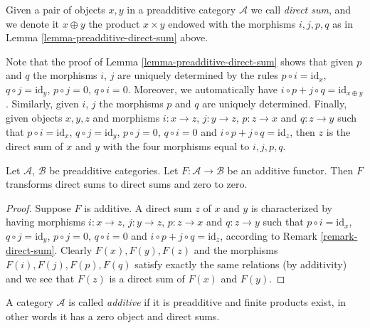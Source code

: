 \begin{definition}
\label{definition-direct-sum}
Given a pair of objects $x, y$
in a preadditive category $\mathcal{A}$ we call
{\it direct sum}, and we denote it $x \oplus y$ the
product $x \times y$ endowed with the morphisms
$i, j, p, q$ as in Lemma \ref{lemma-preadditive-direct-sum} above.
\end{definition}

\begin{remark}
\label{remark-direct-sum}
Note that the proof of Lemma \ref{lemma-preadditive-direct-sum}
shows that given $p$ and $q$ the morphisms $i$, $j$ are uniquely
determined by the rules $p \circ i = \text{id}_x$,
$q \circ j = \text{id}_y$, $p \circ j = 0$, $q \circ i = 0$.
Moreover, we automatically have
$i \circ p + j \circ q = \text{id}_{x \oplus y}$.
Similarly, given $i$, $j$ the morphisms $p$ and $q$ are uniquely determined.
Finally, given objects $x, y, z$ and morphisms
$i : x \to z$, $j : y \to z$, $p : z \to x$ and
$q : z \to y$ such that $p \circ i = \text{id}_x$,
$q \circ j = \text{id}_y$, $p \circ j = 0$, $q \circ i = 0$
and $i \circ p + j \circ q = \text{id}_z$, then $z$
is the direct sum of $x$ and $y$ with the four morphisms
equal to $i, j, p, q$.
\end{remark}

\begin{lemma}
\label{lemma-additive-additive}
Let $\mathcal{A}$, $\mathcal{B}$ be preadditive categories.
Let $F : \mathcal{A} \to \mathcal{B}$ be an additive functor.
Then $F$ transforms direct sums to direct sums and zero to zero.
\end{lemma}

\begin{proof}
Suppose $F$ is additive. A direct sum $z$
of $x$ and $y$ is characterized by having morphisms
$i : x \to z$, $j : y \to z$, $p : z \to x$ and
$q : z \to y$ such that $p \circ i = \text{id}_x$,
$q \circ j = \text{id}_y$, $p \circ j = 0$, $q \circ i = 0$
and $i \circ p + j \circ q = \text{id}_z$, according
to Remark \ref{remark-direct-sum}. Clearly $F(x), F(y), F(z)$
and the morphisms $F(i), F(j), F(p), F(q)$ satisfy exactly the
same relations (by additivity) and we see that $F(z)$ is
a direct sum of $F(x)$ and $F(y)$.
\end{proof}

\begin{definition}
\label{definition-additive-category}
A category $\mathcal{A}$ is called {\it additive}
if it is preadditive and finite products exist, in other
words it has a zero object and direct sums.
\end{definition}

